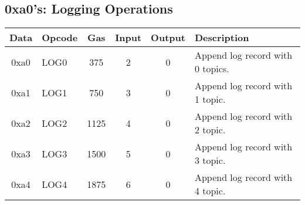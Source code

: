 \documentclass[10pt,letterpaper,leqno,bibliography=totoc]{scrartcl}
\newenvironment{alphafootnotes}
{\par\edef\savedfootnotenumber{\number\value{footnote}}
\renewcommand{\thefootnote}{\alph{footnote}}
\setcounter{footnote}{0}}
{\par\setcounter{footnote}{\savedfootnotenumber}}
\begin{document}
\begin{alphafootnotes}
		\subsection{0xa0's: Logging Operations}
			\begin{longtable}{|cP{2.8cm}cccp{6cm}|}
		        \hline  
		        \textbf{Data} & \textbf{Opcode} & \textbf{Gas}  & \textbf{Input}  & \textbf{Output} & \textbf{Description} \\
		        \hline  
			0xa0 & LOG0 & 375 & 2 & 0 & Append log record with 0 topics. \\
			0xa1 & LOG1 & 750 & 3 & 0 & Append log record with 1 topic. \\
			0xa2 & LOG2 & 1125 & 4 & 0 & Append log record with 2 topic. \\
			0xa3 & LOG3 & 1500 & 5 & 0 & Append log record with 3 topic. \\
			0xa4 & LOG4 & 1875 & 6 & 0 & Append log record with 4 topic. \\
			\hline
			\end{longtable}


\end{alphafootnotes}
\end{document}
